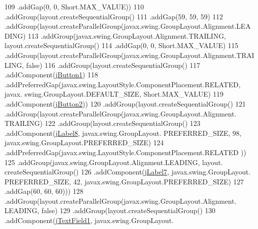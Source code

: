 \begin{DoxyCode}
109                 .addGap(0, 0, Short.MAX\_VALUE))
110             .addGroup(layout.createSequentialGroup()
111                 .addGap(59, 59, 59)
112                 .addGroup(layout.createParallelGroup(javax.swing.GroupLayout.Alignment.LEADING)
113                     .addGroup(javax.swing.GroupLayout.Alignment.TRAILING, layout.createSequentialGroup()
114                         .addGap(0, 0, Short.MAX\_VALUE)
115                         .addGroup(layout.createParallelGroup(javax.swing.GroupLayout.Alignment.TRAILING, \textcolor{keyword}{
      false})
116                             .addGroup(layout.createSequentialGroup()
117                                 .addComponent(\mbox{\hyperlink{class_interfaz_package_1_1_verificar_lector_a104af7dfee375e893832d6c38d12a1dd}{jButton1}})
118                                 .addPreferredGap(javax.swing.LayoutStyle.ComponentPlacement.RELATED, javax.
      swing.GroupLayout.DEFAULT\_SIZE, Short.MAX\_VALUE)
119                                 .addComponent(\mbox{\hyperlink{class_interfaz_package_1_1_verificar_lector_a05b1ef2e05306def8a78c0e4ee0802fb}{jButton2}}))
120                             .addGroup(layout.createSequentialGroup()
121                                 .addGroup(layout.createParallelGroup(javax.swing.GroupLayout.Alignment.
      TRAILING)
122                                     .addGroup(layout.createSequentialGroup()
123                                         .addComponent(\mbox{\hyperlink{class_interfaz_package_1_1_verificar_lector_a52d146b88c9bbed0098e87f7e4f3a759}{jLabel8}}, javax.swing.GroupLayout.
      PREFERRED\_SIZE, 98, javax.swing.GroupLayout.PREFERRED\_SIZE)
124                                         .addPreferredGap(javax.swing.LayoutStyle.ComponentPlacement.RELATED
      ))
125                                     .addGroup(javax.swing.GroupLayout.Alignment.LEADING, layout.
      createSequentialGroup()
126                                         .addComponent(\mbox{\hyperlink{class_interfaz_package_1_1_verificar_lector_abffae3dbc14e8cf54a27d75cbd7cb040}{jLabel7}}, javax.swing.GroupLayout.
      PREFERRED\_SIZE, 42, javax.swing.GroupLayout.PREFERRED\_SIZE)
127                                         .addGap(60, 60, 60)))
128                                 .addGroup(layout.createParallelGroup(javax.swing.GroupLayout.Alignment.
      LEADING, \textcolor{keyword}{false})
129                                     .addGroup(layout.createSequentialGroup()
130                                         .addComponent(\mbox{\hyperlink{class_interfaz_package_1_1_verificar_lector_a7c056e1870eb31ca108b4da56a7d93f4}{jTextField1}}, javax.swing.GroupLayout.

\end{DoxyCode}
